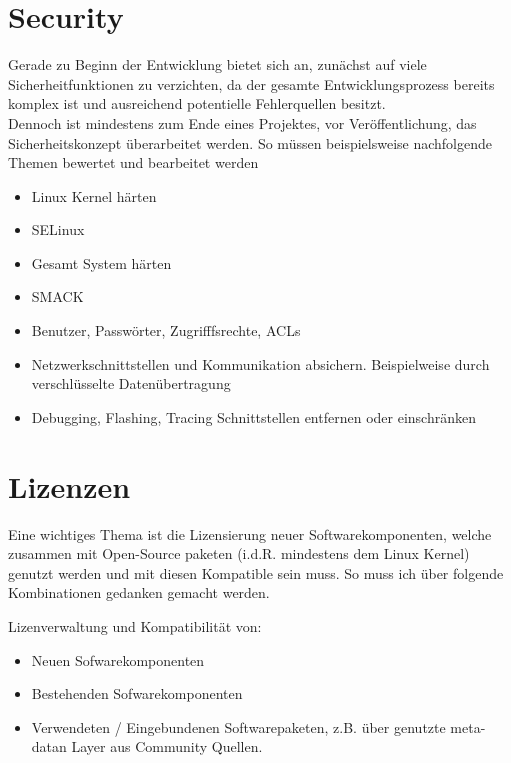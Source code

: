 \section{Security}%
Gerade zu Beginn der Entwicklung bietet sich an, zunächst auf viele
Sicherheit\-funktionen zu verzichten, da der gesamte Entwicklungs\-prozess
bereits komplex ist und ausreichend potentielle Fehlerquellen besitzt.
\\

Dennoch ist mindestens zum Ende eines Projektes, vor Veröffentlichung, das
Sicherheits\-konzept überarbeitet werden.
So müssen beispielsweise nachfolgende Themen bewertet und bearbeitet werden
\label{sec:security}

\begin{itemize}
    \item Linux Kernel härten
    \item SELinux
    \item Gesamt System härten
    \item SMACK
    \item Benutzer, Passwörter, Zugrifffsrechte, ACLs
    \item Netzwerkschnittstellen und Kommunikation absichern. Beispielweise
        durch verschlüsselte Datenübertragung
    \item Debugging, Flashing, Tracing Schnittstellen entfernen oder
        einschränken
\end{itemize}


\section{Lizenzen}%
\label{sec:lizenzen}

Eine wichtiges Thema ist die Lizensierung neuer Softwarekomponenten, welche
zusammen mit Open-Source paketen (i.d.R. mindestens dem Linux Kernel) genutzt
werden und mit diesen Kompatible sein muss. So muss ich über folgende
Kombinationen gedanken gemacht werden.

Lizenverwaltung und Kompatibilität von:
\begin{itemize}
    \item Neuen Sofwarekomponenten
    \item Bestehenden  Sofwarekomponenten
    \item Verwendeten / Eingebundenen Softwarepaketen, z.B. über genutzte
        meta-datan Layer aus Community Quellen.
\end{itemize}











